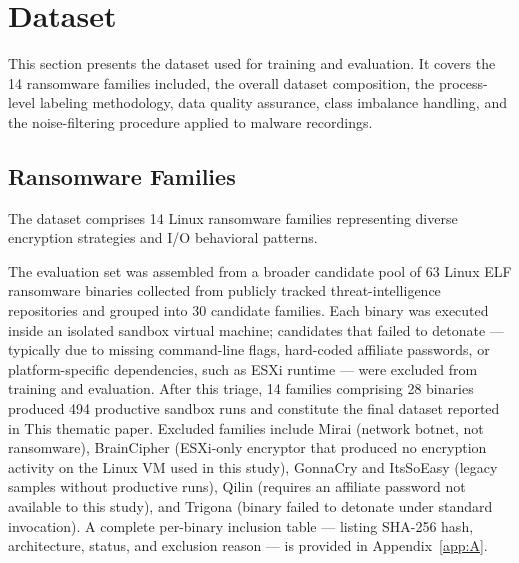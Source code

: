 \section{Dataset}\label{sec:3.3}

This section presents the dataset used for training and evaluation. It covers the 14 ransomware families included, the overall dataset composition, the process-level labeling methodology, data quality assurance, class imbalance handling, and the noise-filtering procedure applied to malware recordings.

\subsection{Ransomware Families}\label{sec:3.3.1}

The dataset comprises 14 Linux ransomware families representing diverse encryption strategies and I/\allowbreak{}O behavioral patterns.

The evaluation set was assembled from a broader candidate pool of 63 Linux ELF ransomware binaries collected from publicly tracked threat-intelligence repositories and grouped into 30 candidate families. Each binary was executed inside an isolated sandbox virtual machine; candidates that failed to detonate --- typically due to missing command-line flags, hard-coded affiliate passwords, or platform-specific dependencies, such as ESXi runtime --- were excluded from training and evaluation. After this triage, 14 families comprising 28 binaries produced 494 productive sandbox runs and constitute the final dataset reported in This thematic paper. Excluded families include Mirai (network botnet, not ransomware), BrainCipher (ESXi-only encryptor that produced no encryption activity on the Linux VM used in this study), GonnaCry and ItsSoEasy (legacy samples without productive runs), Qilin (requires an affiliate password not available to this study), and Trigona (binary failed to detonate under standard invocation). A complete per-binary inclusion table --- listing SHA-256 hash, architecture, status, and exclusion reason --- is provided in Appendix~\ref{app:A}.

